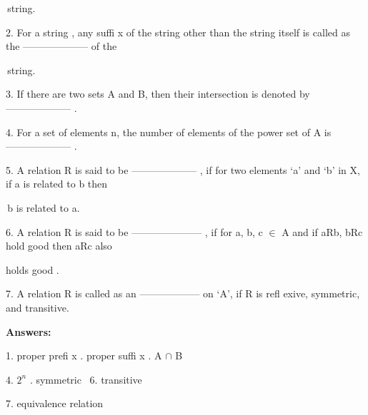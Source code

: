 \documentclass[10pt,a4paper]{book}
\begin{document}
\quad\,string.

2. For a string , any suffi x of the string other than the string itself is called as the -------------------- of the

\quad\,string.

3. If there are two sets A and B, then their intersection is denoted by -------------------- .

4. For a set of elements n, the number of elements of the power set of A is -------------------- .

5. A relation R is said to be -------------------- , if for two elements ‘a’ and ‘b’ in X, if a is related to b then

\quad\,b is related to a.

6. A relation R is said to be --------------------- , if for a, b, c $\in$ A and if aRb, bRc hold good then aRc also

holds good .

7. A relation R is called as an ------------------ on ‘A’, if R is refl exive, symmetric, and transitive.

\qquad \tiny 
\qquad

\textsf{\textbf{Answers:}}

\qquad \tiny 

1. proper prefi x \qquad\qquad{}. proper suffi x \qquad\qquad{}. A $\cap$ B

4. $2^{n}$ \qquad\qquad\qquad\qquad\qquad{}. symmetric \qquad\qquad\quad\quad\quad\, 6. transitive

7. equivalence relation
\end{document}
